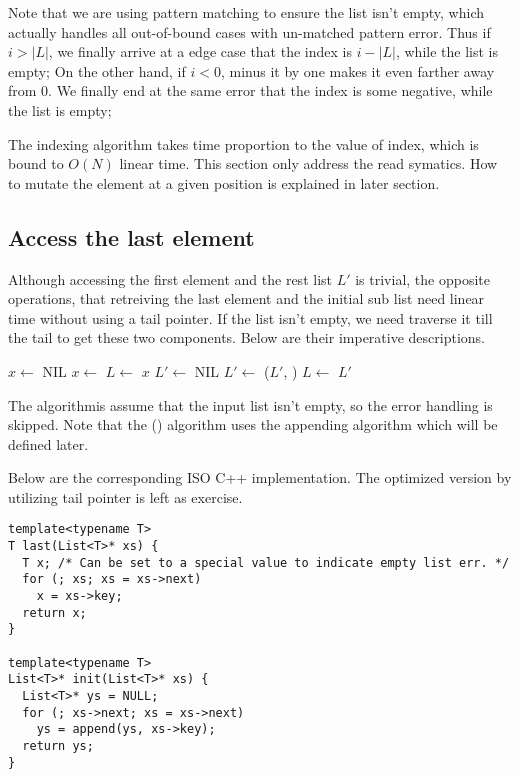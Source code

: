 \documentclass{article}
\begin{document}
Note that we are using pattern matching to ensure the list isn't empty, which actually handles
all out-of-bound cases with un-matched pattern error. Thus if $i > |L|$, we finally arrive at
a edge case that the index is $i-|L|$, while the list is empty; On the other hand, if $i < 0$,
minus it by one makes it even farther away from 0. We finally end at the same error that the index 
is some negative, while the list is empty;

The indexing algorithm takes time proportion to the value of index, which is bound to $O(N)$
linear time. 
This section only address the read symatics. How to mutate the element at a given position is
explained in later section.

\subsection{Access the last element}
Although accessing the first element and the rest list $L'$ is trivial, the opposite operations, that
retreiving the last element and the initial sub list need linear time without using a tail pointer. 
If the list isn't empty, we need traverse it till the tail to get these two components. Below are 
their imperative descriptions.

\begin{algorithmic}
  \State $x \gets $ NIL
    \State $x \gets $ 
    \State $L \gets $ 
  \EndWhile
  \State \Return $x$
\EndFunction
\Statex
{}
  \State $L' \gets $ NIL
    \State $L' \gets$ ($L'$, )
    \State $L \gets $ 
  \EndWhile
  \State \Return $L'$
\EndFunction
\end{algorithmic}

The algorithmis assume that the input list isn't empty, so the error handling is skipped. Note that
the () algorithm uses the appending algorithm which will be defined later.

Below are the corresponding ISO C++ implementation. The optimized version by utilizing tail pointer
is left as exercise.

\lstset{language=C++}
\begin{lstlisting}
template<typename T>
T last(List<T>* xs) {
  T x; /* Can be set to a special value to indicate empty list err. */
  for (; xs; xs = xs->next)
    x = xs->key;
  return x;
}

template<typename T>
List<T>* init(List<T>* xs) {
  List<T>* ys = NULL;
  for (; xs->next; xs = xs->next)
    ys = append(ys, xs->key);
  return ys;
}
\end{lstlisting}
\end{document}
